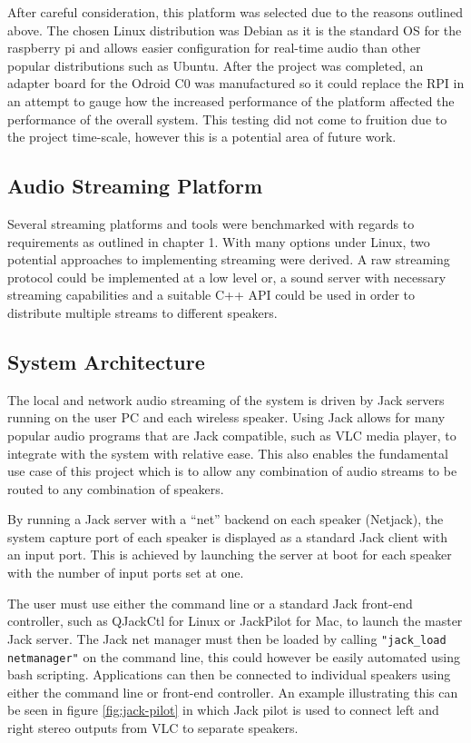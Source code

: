 \documentclass[main.tex]{subfiles}
\begin{document}
\medskip
After careful consideration, this platform was selected due to the reasons outlined above. 
The chosen Linux distribution was Debian as it is the standard OS for the raspberry pi and allows easier configuration for real-time audio than other popular distributions such as Ubuntu. 
After the project was completed, an adapter board for the Odroid C0 was manufactured so it could replace the RPI in an attempt to gauge how the increased performance of the platform affected the performance of the overall system.
This testing did not come to fruition due to the project time-scale, however this is a potential area of future work. 

\subsection{Audio Streaming Platform}
Several streaming platforms and tools were benchmarked with regards to requirements as outlined in chapter 1. 
With many options under Linux, two potential approaches to implementing streaming were derived. 
A raw streaming protocol could be implemented at a low level or, a sound server with necessary streaming capabilities and a suitable C++ API could be used in order to distribute multiple streams to different speakers.

\medskip

\medskip

\subsection{System Architecture}
The local and network audio streaming of the system is driven by Jack servers running on the user PC and each wireless speaker.
Using Jack allows for many popular audio programs that are Jack compatible, such as VLC media player, to integrate with the system with relative ease.
This also enables the fundamental use case of this project which is to allow any combination of audio streams to be routed to any combination of speakers.

\medskip
By running a Jack server with a ``net'' backend on each speaker (Netjack), the system capture port of each speaker is displayed as a standard Jack client with an input port. 
This is achieved by launching the server at boot for each speaker with the number of input ports set at one.
 
The user must use either the command line or a standard Jack front-end controller, such as QJackCtl for Linux or JackPilot for Mac, to launch the master Jack server. 
The Jack net manager must then be loaded by calling \lstinline{"jack_load netmanager"}  on the command line, this could however be easily automated using bash scripting.
Applications can then be connected to individual speakers using either the command line or front-end controller.
An example illustrating this can be seen in figure \ref{fig:jack-pilot} in which Jack pilot is used to connect left and right stereo outputs from VLC to separate speakers. 
\end{document}
